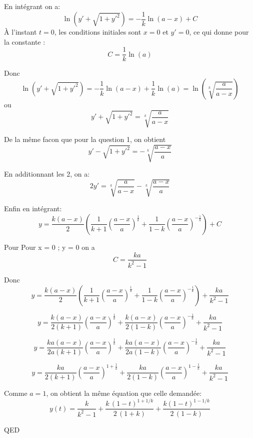 \documentclass[]{book}
\theoremstyle{definition}
\begin{document}
En int\'egrant on a:
$$
\ln(y'+{\sqrt  {1+y'^{2}}})=-\frac{1}{k}\ln(a-x)+C
$$
\`A l'instant $t=0$, les conditions initiales sont $x=0$ et $y'=0$, ce qui donne pour la constante :
$$
C=\frac{1}{k}\ln(a)
$$

Donc
$$
\ln(y'+{\sqrt  {1+y'^{2}}})=-\frac{1}{k}\ln(a-x)+\frac{1}{k}\ln(a) = \ln \left(\sqrt[k]{\frac{a}{a-x}}\right)
$$
ou
$$
y'+\sqrt  {1+y'^{2}}=\sqrt[k]{\frac{a}{a-x}}
$$

De la m\^eme facon que pour la question 1, on obtient
$$
y'-\sqrt  {1+y'^{2}}=-\sqrt[k]{\frac{a-x}{a}}
$$

En additionnant les 2, on a:
$$
2y' = \sqrt[k]{\frac{a}{a-x}} - \sqrt[k]{\frac{a-x}{a}}
$$

Enfin en int\'egrant:
$$
y={\frac{k(a-x)}{2}}\left({\frac{1}{k+1}}\left({\frac{a-x}{a}}\right)^{{{\frac{1}{k}}}}+{\frac{1}{1-k}}\left({\frac{a-x}{a}}\right)^{{-{\frac  {1}{k}}}}\right)+C
$$

Pour Pour x = 0 ; y = 0 on a 
$$
C=\frac  {ka}{k^{2}-1}
$$

Donc
$$y={\frac{k(a-x)}{2}}\left({\frac{1}{k+1}}\left({\frac{a-x}{a}}\right)^{{{\frac{1}{k}}}}+{\frac{1}{1-k}}\left({\frac{a-x}{a}}\right)^{{-{\frac  {1}{k}}}}\right)+ \frac  {ka}{k^{2}-1}
$$

$$y={\frac{k(a-x)}{2(k+1)}}\left({\frac{a-x}{a}}\right)^{{{\frac{1}{k}}}}+{\frac{k(a-x)}{2(1-k)}}\left({\frac{a-x}{a}}\right)^{{-{\frac  {1}{k}}}} + \frac  {ka}{k^{2}-1}
$$

$$y={\frac{ka(a-x)}{2a(k+1)}}\left({\frac{a-x}{a}}\right)^{{{\frac{1}{k}}}}+{\frac{ka(a-x)}{2a(1-k)}}\left({\frac{a-x}{a}}\right)^{{-{\frac  {1}{k}}}} + \frac  {ka}{k^{2}-1}
$$

$$y={\frac{ka}{2(k+1)}}\left({\frac{a-x}{a}}\right)^{{{1+\frac{1}{k}}}}+{\frac{ka}{2(1-k)}}\left({\frac{a-x}{a}}\right)^{{1-{\frac  {1}{k}}}} + \frac  {ka}{k^{2}-1}
$$

Comme $a =1$, on obtient la m\^eme \'equation que celle demand\'ee:
$$
y(t) = \frac{k}{k^2-1} + \frac{k\,(1-t)^{1+1/k}}{2\,(1+k)}+\frac{k(1-t)^{1-1/k}}{2\,(1-k)}
$$







QED
\end{document}
